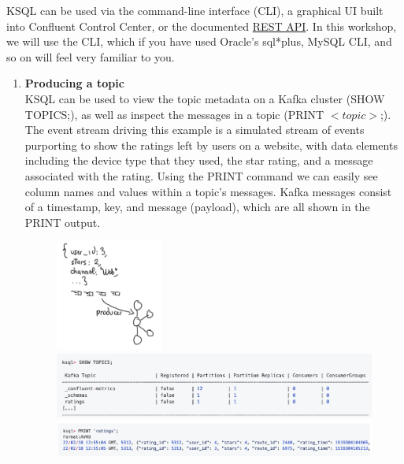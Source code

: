 \documentclass[10pt,a4paper]{article}
\begin{document}
 KSQL can be used via the command-line interface (CLI), a graphical UI built into Confluent Control Center, or the documented \href{https://docs.ksqldb.io/en/latest/developer-guide/api/index.html}{REST API}.
 In this workshop, we will use the CLI, which if you have used Oracle’s sql*plus, MySQL CLI, and so on will feel very familiar to you.
 \begin{enumerate}
 	\item \textbf{Producing a topic} \\
 	KSQL can be used to view the topic metadata on a Kafka cluster (SHOW TOPICS;), as well as inspect the messages in a topic (PRINT $<topic>$;). \\ The event stream driving this example is a simulated stream of events purporting to show the ratings left by users on a website, with data elements including the device type that they used, the star rating, and a message associated with the rating. Using the PRINT command we can easily see column names and values within a topic’s messages. Kafka messages consist of a timestamp, key, and message (payload), which are all shown in the PRINT output.
  \begin{figure}[ht!]
  \hfill \includegraphics[width=100pt]{images/ksql-demo-1}\hspace*{\fill}
\vspace{0.1em} \center 
 \hfill \includegraphics[width=400pt]{images/ksql-cmd1}\hspace*{\fill}
\vspace{0.1em} \center 
 \hfill \includegraphics[width=400pt]{images/ksql-cmd2}\hspace*{\fill} 
 \end{figure} 
 

\end{enumerate}
\end{document}
